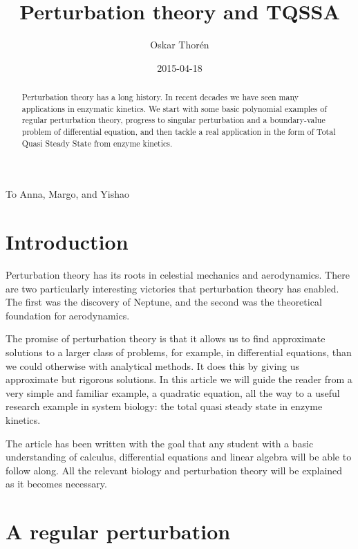 \documentclass[12pt]{article}
\title{Perturbation theory and TQSSA}
\author{Oskar Thor\'{e}n}
\date{2015-04-18}
\newenvironment{dedication}
  {\clearpage           %
   \thispagestyle{empty}%
   \vspace*{\stretch{1}}%
   \itshape             %
   \raggedleft          %
  }
  {\par %
   \vspace{\stretch{3}} %
   \clearpage           %
  }
\begin{document}
\maketitle
\nocite{*} %

\begin{abstract}
  Perturbation theory has a long history. In recent decades we have
  seen many applications in enzymatic kinetics. We start with some
  basic polynomial examples of regular perturbation theory, progress
  to singular perturbation and a boundary-value problem of
  differential equation, and then tackle a real application in the
  form of Total Quasi Steady State from enzyme kinetics.
\end{abstract}

\begin{dedication}
To Anna, Margo, and Yishao
\end{dedication}

\clearpage
\tableofcontents
\clearpage

\section{Introduction}

Perturbation theory has its roots in celestial mechanics and
aerodynamics. There are two particularly interesting victories that
perturbation theory has enabled. The first was the discovery of
Neptune, and the second was the theoretical foundation for
aerodynamics.

The promise of perturbation theory is that it allows us to find
approximate solutions to a larger class of problems, for example, in
differential equations, than we could otherwise with analytical
methods. It does this by giving us approximate but rigorous
solutions. In this article we will guide the reader from a very simple
and familiar example, a quadratic equation, all the way to a useful
research example in system biology: the total quasi steady state in
enzyme kinetics.

The article has been written with the goal that any student with a
basic understanding of calculus, differential equations and linear
algebra will be able to follow along. All the relevant biology and
perturbation theory will be explained as it becomes necessary.

\newpage
\section{A regular perturbation}
\end{document}
